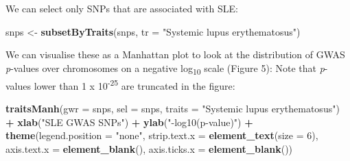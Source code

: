 \documentclass[9pt,a4paper,]{extarticle}
\newenvironment{Shaded}{\begin{snugshade}}{\end{snugshade}}
\newcommand{\KeywordTok}[1]{\textcolor[rgb]{0.13,0.29,0.53}{\textbf{#1}}}
\newcommand{\DataTypeTok}[1]{\textcolor[rgb]{0.13,0.29,0.53}{#1}}
\newcommand{\DecValTok}[1]{\textcolor[rgb]{0.00,0.00,0.81}{#1}}
\newcommand{\StringTok}[1]{\textcolor[rgb]{0.31,0.60,0.02}{#1}}
\newcommand{\OperatorTok}[1]{\textcolor[rgb]{0.81,0.36,0.00}{\textbf{#1}}}
\newcommand{\NormalTok}[1]{#1}
\theoremstyle{definition}
\theoremstyle{definition}
\theoremstyle{definition}
\theoremstyle{remark}
\begin{document}
We can select only SNPs that are associated with SLE:

\begin{Shaded}
\begin{Highlighting}[]
\NormalTok{snps <-}\StringTok{ }\KeywordTok{subsetByTraits}\NormalTok{(snps, }\DataTypeTok{tr =} \StringTok{"Systemic lupus erythematosus"}\NormalTok{)}
\end{Highlighting}
\end{Shaded}

We can visualise these as a Manhattan plot to look at the distribution of GWAS \emph{p}-values over chromosomes on a negative log\textsubscript{10} scale (Figure 5):
Note that \emph{p}-values lower than 1 x 10\textsuperscript{-25} are truncated in the figure:

\begin{Shaded}
\begin{Highlighting}[]
\KeywordTok{traitsManh}\NormalTok{(}\DataTypeTok{gwr =}\NormalTok{ snps, }\DataTypeTok{sel =}\NormalTok{ snps, }\DataTypeTok{traits =} \StringTok{"Systemic lupus erythematosus"}\NormalTok{) }\OperatorTok{+}
\StringTok{  }\KeywordTok{xlab}\NormalTok{(}\StringTok{"SLE GWAS SNPs"}\NormalTok{) }\OperatorTok{+}
\StringTok{  }\KeywordTok{ylab}\NormalTok{(}\StringTok{"-log10(p-value)"}\NormalTok{) }\OperatorTok{+}
\StringTok{  }\KeywordTok{theme}\NormalTok{(}\DataTypeTok{legend.position =} \StringTok{"none"}\NormalTok{,}
        \DataTypeTok{strip.text.x =} \KeywordTok{element_text}\NormalTok{(}\DataTypeTok{size =} \DecValTok{6}\NormalTok{),}
        \DataTypeTok{axis.text.x =} \KeywordTok{element_blank}\NormalTok{(),}
        \DataTypeTok{axis.ticks.x =} \KeywordTok{element_blank}\NormalTok{())}
\end{Highlighting}
\end{Shaded}
\end{document}
